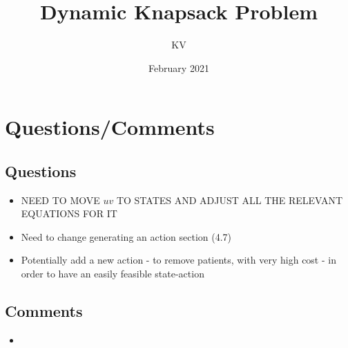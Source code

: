 \documentclass{article}
\title{Dynamic Knapsack Problem}
\author{KV}
\date{February 2021}
\begin{document}
\maketitle
\tableofcontents

\section{Questions/Comments}

\subsection{Questions}
\begin{itemize}
	\item  NEED TO MOVE $uv$ TO STATES AND ADJUST ALL THE RELEVANT EQUATIONS FOR IT
	\item Need to change generating an action section (4.7)
	\item Potentially add a new action - to remove patients, with very high cost - in order to have an easily feasible state-action
\end{itemize}

\subsection{Comments}
\begin{itemize}
	\item
\end{itemize}
\end{document}
